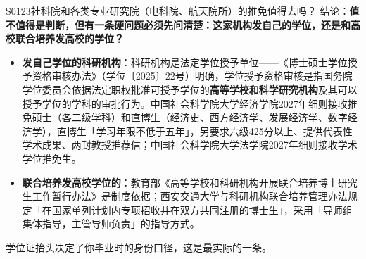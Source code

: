 \begin{qa}{S0123}{社科院和各类专业研究院（电科院、航天院所）的推免值得去吗？}
结论：\textbf{值不值得是判断，但有一条硬问题必须先问清楚：这家机构发自己的学位，还是和高校联合培养发高校的学位？}

\begin{itemize}
  \item \textbf{发自己学位的科研机构}：科研机构是法定学位授予单位——《博士硕士学位授予资格审核办法》（学位〔2025〕22号）明确，学位授予资格审核是指国务院学位委员会依据法定职权批准可授予学位的\textbf{高等学校和科学研究机构}及其可以授予学位的学科的审批行为。中国社会科学院大学经济学院2027年细则接收推免硕士（各二级学科）和直博生（经济史、西方经济学、发展经济学、数字经济学），直博生「学习年限不低于五年」，另要求六级425分以上、提供代表性学术成果、两封教授推荐信；中国社会科学院大学法学院2027年细则接收学术学位推免生。
  \item \textbf{联合培养发高校学位的}：教育部《高等学校和科研机构开展联合培养博士研究生工作暂行办法》是制度依据；西安交通大学与科研机构联合培养管理办法规定「在国家单列计划内专项招收并在双方共同注册的博士生」，采用「导师组集体指导，主管导师负责」的指导方式。
\end{itemize}

学位证抬头决定了你毕业时的身份口径，这是最实际的一条。
\end{qa}

